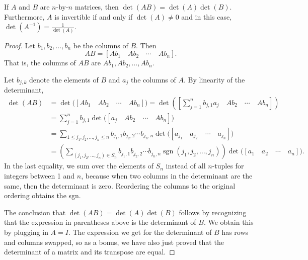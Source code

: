 \begin{prop}
If $A$ and $B$ are $n$-by-$n$ matrices, then $\det(AB) = \det(A)\det(B)$.
Furthermore, $A$ is invertible if and only if $\det(A) \neq 0$ and in
this case, $\det(A^{-1}) = \frac{1}{\det(A)}$.
\end{prop}

\begin{proof}
Let $b_1,b_2,\ldots,b_n$ be the columns of $B$.  Then
\begin{equation*}
AB = [ Ab_1 \quad Ab_2 \quad  \cdots \quad  Ab_n ] .
\end{equation*}
That is, the columns of $AB$ are
$Ab_1,Ab_2,\ldots,Ab_n$.

Let $b_{j,k}$ denote the elements of $B$ and
$a_j$ the columns of $A$.
By linearity of the determinant,
\begin{equation*}
\begin{split}
\det(AB) & =  
\det \bigl([ Ab_1 \quad Ab_2 \quad  \cdots \quad  Ab_n ] \bigr) =
\det \left(\left[ \sum_{j=1}^n b_{j,1} a_j \quad Ab_2 \quad  \cdots \quad  Ab_n \right]\right) \\
& =
\sum_{j=1}^n
b_{j,1}
\det \bigl([ a_j \quad Ab_2 \quad  \cdots \quad  Ab_n ]\bigr) \\
& =
\sum_{1 \leq j_1,j_2,\ldots,j_n \leq n}
b_{j_1,1}
b_{j_2,2}
\cdots
b_{j_n,n}
\det \bigl([ a_{j_1} \quad a_{j_2} \quad  \cdots \quad  a_{j_n} ]\bigr) \\
& =
\left(
\sum_{(j_1,j_2,\ldots,j_n) \in S_n}
b_{j_1,1}
b_{j_2,2}
\cdots
b_{j_n,n}
\operatorname{sgn}(j_1,j_2,\ldots,j_n)
\right)
\det \bigl([ a_{1} \quad a_{2} \quad  \cdots \quad  a_{n} ]\bigr) .
\end{split}
\end{equation*}
In the last equality, we sum over the elements of $S_n$
instead of all $n$-tuples for integers between 1 and $n$,
because
when two columns in the determinant are the same, then the
determinant is zero.  Reordering the columns to the
original ordering obtains the sgn.

The conclusion that $\det(AB) = \det(A)\det(B)$
follows by recognizing that the expression in parentheses above is the determinant of $B$.  
We obtain this by plugging in $A=I$.
The expression we get for the determinant of $B$ has rows and columns
swapped, so as a bonus, we have also just proved that the determinant of
a matrix and its transpose are equal.


\end{proof}
